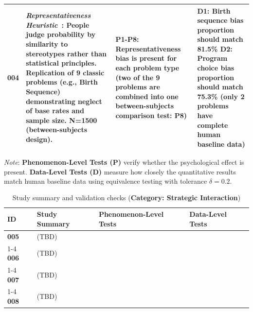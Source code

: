 \begin{table}[htbp]
\begin{tabular}{p{1cm}p{5.5cm}p{4cm}p{4cm}}
         \textbf{004} 
         & \textit{Representativeness Heuristic}~\cite{}: People judge probability by similarity to stereotypes rather than statistical principles. \newline Replication of 9 classic problems (e.g., Birth Sequence) demonstrating neglect of base rates and sample size. N=1500 (between-subjects design). 
          & P1-P8: Representativeness bias is present for each problem type (two of the 9 problems are combined into one between-subjects comparison test: P8)
          & D1: Birth sequence bias proportion should match 81.5\% \newline D2: Program choice bias proportion should match 75.3\% (only 2 problems have complete human baseline data) \\
        
        \bottomrule
    \end{tabular}
    
    \vspace{0.3cm}
    \small
    \textit{Note}: \textbf{Phenomenon-Level Tests (P)} verify whether the psychological effect is present. \textbf{Data-Level Tests (D)} measure how closely the quantitative results match human baseline data using equivalence testing with tolerance $\delta = 0.2$.
\end{table}

\begin{table}[htbp]
    \centering
    \caption{Study summary and validation checks (\textbf{Category: Strategic Interaction})}
    \label{tab:study_summary_strategic}
    \begin{tabular}{p{1cm}p{5.5cm}p{4cm}p{3.5cm}}
        \toprule
        \textbf{ID} & \textbf{Study Summary} & \textbf{Phenomenon-Level Tests} & \textbf{Data-Level Tests} \\
        \midrule
        
        \textbf{005} & (TBD) & & \\ \cmidrule{1-4}
        \textbf{006} & (TBD) & & \\ \cmidrule{1-4}
        \textbf{007} & (TBD) & & \\ \cmidrule{1-4}
        \textbf{008} & (TBD) & & \\
        
        \bottomrule
    \end{tabular}
    
    \vspace{0.3cm}
    \small
\end{table}


